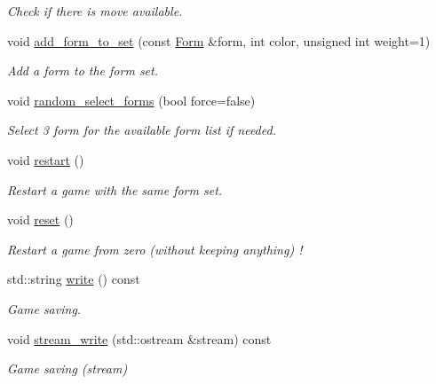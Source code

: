 \begin{DoxyCompactItemize}
\begin{DoxyCompactList}\small\item\em Check if there is move available. \end{DoxyCompactList}\item 
void \hyperlink{classmain_game_a72858da366dd6abe29ea1e703e1bbbf8}{add\+\_\+form\+\_\+to\+\_\+set} (const \hyperlink{class_form}{Form} \&form, int color, unsigned int weight=1)
\begin{DoxyCompactList}\small\item\em Add a form to the form set. \end{DoxyCompactList}\item 
void \hyperlink{classmain_game_a9d796e10ca081ec5a25b4eecfd97d1de}{random\+\_\+select\+\_\+forms} (bool force=false)
\begin{DoxyCompactList}\small\item\em Select 3 form for the available form list if needed. \end{DoxyCompactList}\item 
void \hyperlink{classmain_game_a0fea171cf6984f14904fe4a4c548db2b}{restart} ()
\begin{DoxyCompactList}\small\item\em Restart a game with the same form set. \end{DoxyCompactList}\item 
void \hyperlink{classmain_game_a6bf4986a2943277dcfbb24ecb89f8e2f}{reset} ()
\begin{DoxyCompactList}\small\item\em Restart a game from zero (without keeping anything) ! \end{DoxyCompactList}\item 
std\+::string \hyperlink{classmain_game_a4008fd9fe3a236d044d580725cdf0920}{write} () const
\begin{DoxyCompactList}\small\item\em Game saving. \end{DoxyCompactList}\item 
void \hyperlink{classmain_game_a29dc58fda69f709f1c34a3aa57955fb2}{stream\+\_\+write} (std\+::ostream \&stream) const
\begin{DoxyCompactList}\small\item\em Game saving (stream) \end{DoxyCompactList}\end{DoxyCompactItemize}
